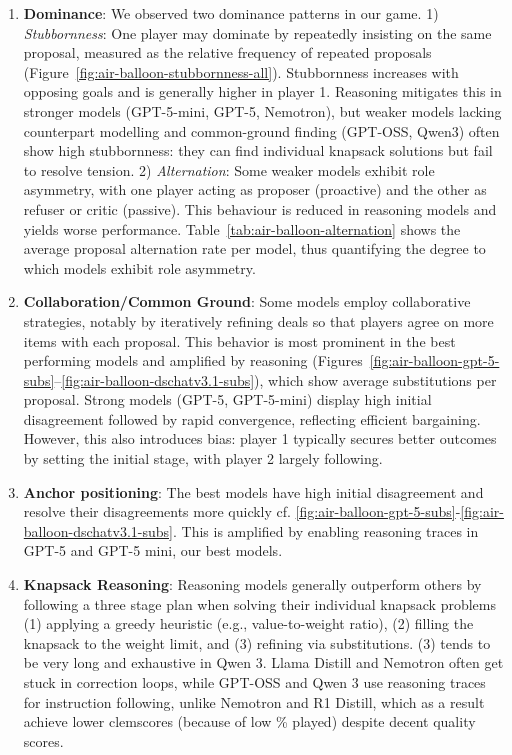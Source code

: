 \documentclass[11pt]{article}
\begin{document}
\begin{enumerate}
    \item \textbf{Dominance}: We observed two dominance patterns in our game.  
1) \emph{Stubbornness}: One player may dominate by repeatedly insisting on the same proposal, measured as the relative frequency of repeated proposals (Figure~\ref{fig:air-balloon-stubbornness-all}). Stubbornness increases with opposing goals and is generally higher in player 1. Reasoning mitigates this in stronger models (GPT-5-mini, GPT-5, Nemotron), but weaker models lacking counterpart modelling and common-ground finding (GPT-OSS, Qwen3) often show high stubbornness: they can find individual knapsack solutions but fail to resolve tension.  
2) \emph{Alternation}: Some weaker models exhibit role asymmetry, with one player acting as proposer (proactive) and the other as refuser or critic (passive). This behaviour is reduced in reasoning models and yields worse performance. Table~\ref{tab:air-balloon-alternation} shows the average proposal alternation rate per model, thus quantifying the degree to which models exhibit role asymmetry.
\item \textbf{Collaboration/Common Ground}: Some models employ collaborative strategies, notably by iteratively refining deals so that players agree on more items with each proposal. This behavior is most prominent in the best performing models and amplified by reasoning (Figures~\ref{fig:air-balloon-gpt-5-subs}--\ref{fig:air-balloon-dschatv3.1-subs}), which show average substitutions per proposal. Strong models (GPT-5, GPT-5-mini) display high initial disagreement followed by rapid convergence, reflecting efficient bargaining. However, this also introduces bias: player 1 typically secures better outcomes by setting the initial stage, with player 2 largely following.
\item \textbf{Anchor positioning}: The best models have high initial disagreement and resolve their disagreements more quickly cf. \ref{fig:air-balloon-gpt-5-subs}-\ref{fig:air-balloon-dschatv3.1-subs}. This is amplified by enabling reasoning traces in GPT-5 and GPT-5 mini, our best models.
\item \textbf{Knapsack Reasoning}: Reasoning models generally outperform others by following a three stage plan when solving their individual knapsack problems (1) applying a greedy heuristic (e.g., value-to-weight ratio), (2) filling the knapsack to the weight limit, and (3) refining via substitutions. (3) tends to be very long and exhaustive in Qwen 3. Llama Distill and Nemotron often get stuck in correction loops, while GPT-OSS and Qwen 3 use reasoning traces for instruction following, unlike Nemotron and R1 Distill, which as a result achieve lower clemscores (because of low \% played) despite decent quality scores.

\end{enumerate}
\end{document}
